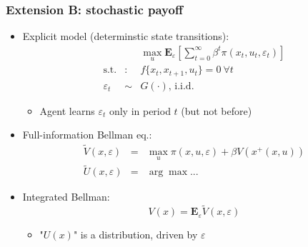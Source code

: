 \documentclass[bigger,handout]{beamer}
\begin{document}
\begin{frame}%

\frametitle{Extension B: stochastic payoff}

\begin{itemize}
\item Explicit model (determinstic state transitions):%
\begin{eqnarray*}
&&\max_{u}\mathbf{E}_{\varepsilon }\left[ \sum\nolimits_{t=0}^{\infty }\beta
^{t}\pi (x_{t},u_{t},\varepsilon _{t})\right] \\
\text{s.t.} &\text{:}&f\{x_{t},x_{t+1},u_{t}\}=0\ \forall t \\
\varepsilon _{t} &\sim &G\left( \cdot \right) \text{, i.i.d.}
\end{eqnarray*}

\begin{itemize}
\item Agent learns $\varepsilon _{t}$ only in period $t$ (but not before)
\end{itemize}

\item Full-information Bellman eq.:%
\begin{eqnarray*}
\tilde{V}\left( x,\varepsilon \right) &=&\max_{u}\pi (x,u,\varepsilon
)+\beta V\left( x^{+}\left( x,u\right) \right) \\
\tilde{U}\left( x,\varepsilon \right) &=&\arg \max ...
\end{eqnarray*}

\item Integrated Bellman:%
\begin{equation*}
V\left( x\right) =\mathbf{E}_{\varepsilon }\tilde{V}\left( x,\varepsilon
\right)
\end{equation*}

\begin{itemize}
\item "$U\left( x\right) $" is a distribution, driven by $\varepsilon $
\end{itemize}
\end{itemize}



\end{frame}%
\end{document}
